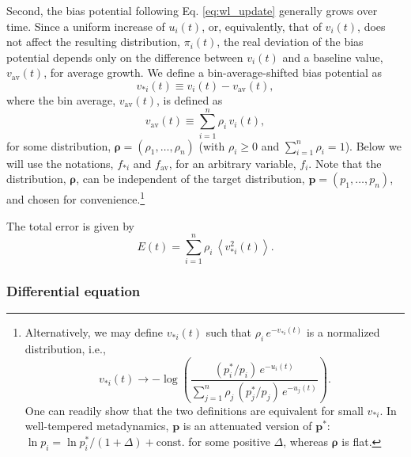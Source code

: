 \documentclass[reprint, superscriptaddress, floatfix]{revtex4-1}
\newcommand{\Err}{E}
\newcommand{\bav}[1]{#1_\mathrm{av}}
\begin{document}
Second, the bias potential following Eq. \eqref{eq:wl_update}
generally grows over time.
%
Since a uniform increase of $u_i(t)$, or, equivalently, that of $v_i(t)$,
does not affect the resulting distribution, $\pi_i(t)$,
the real deviation of the bias potential
depends only on the difference between $v_i(t)$
and a baseline value, $\bav{v}(t)$,
for average growth\cite{
dama2014}.
%
We define a bin-average-shifted bias potential as
%
\begin{equation}
  v_{*i}(t) \equiv v_i(t) - \bav{v}(t)
  ,
\label{eq:x_def}
\end{equation}
%
where the bin average, $\bav{v}(t)$, is defined as
%
\begin{equation}
  \bav{v}(t)
  \equiv \sum_{i = 1}^n \rho_i \, v_i(t)
  ,
\label{eq:vav_def}
\end{equation}
for some distribution,
$\pmb \rho = (\rho_1, \dots, \rho_n)$
(with $\rho_i \ge 0$ and $\sum_{i = 1}^n \rho_i = 1$).
%
Below we will use the notations, $f_{*i}$ and $\bav{f}$,
for an arbitrary variable, $f_i$.
%
Note that the distribution, $\pmb\rho$,
can be independent of
the target distribution,
$\mathbf p = (p_1, \dots, p_n)$,
and chosen for convenience.\footnote{Alternatively,
we may define $v_{*i}(t)$ such that
$\rho_i \, e^{-v_{*i}(t)}$ is a normalized distribution,
i.e.,
$$
v_{*i}(t) \to -\log\left(
  \frac{ (p^*_i/p_i) \, e^{ -u_i(t) } } 
  { \sum_{j=1}^n \rho_j \, (p^*_j/p_j) \, e^{ -u_j(t) } } 
\right).
$$
One can readily show that the two definitions are equivalent
for small $v_{*i}$.
%
In well-tempered metadynamics,
$\mathbf p$ is an attenuated version of
$\mathbf p^*$\cite{
  barducci2008, dama2014}:
$\ln p_i = \ln {p^*_i}/(1+\Delta) + \mathrm{const.}$ for some positive $\Delta$,
whereas $\pmb\rho$ is flat.}

The total error is given by
%
\begin{equation}
  \Err(t)
  =
  \sum_{i = 1}^n \rho_i \,
  \left\langle v_{*i}^2(t) \right\rangle
  .
\label{eq:error_def}
\end{equation}




\subsubsection{\label{sec:sbin_diffeq}
Differential equation}
\end{document}
